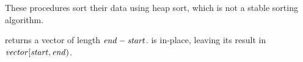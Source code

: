 \begin{protos}
\end{protos}
%
These procedures sort their data using heap sort, 
which is not a stable sorting algorithm.
    
 returns a vector of length \(\var{end}-\var{start}\). 
 is in-place, leaving its result in
\(\var{vector}[\var{start},\var{end})\).


    





